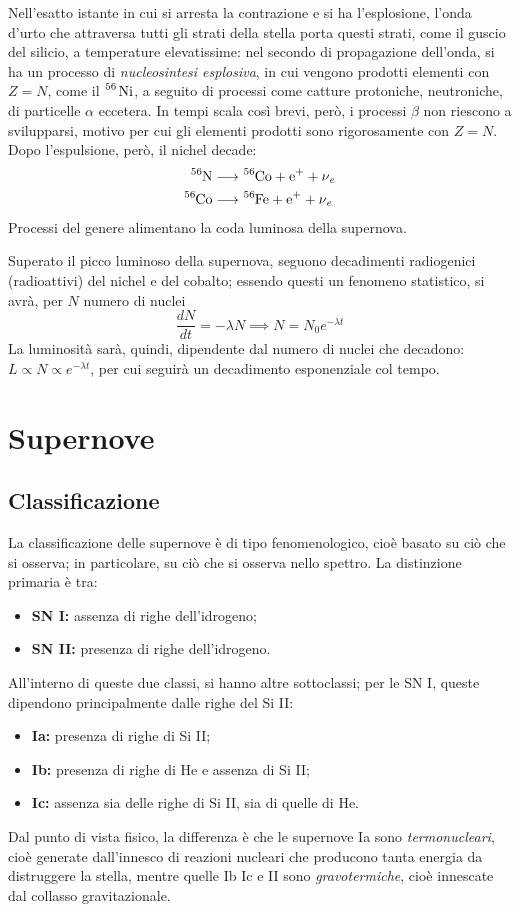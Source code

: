\documentclass[11pt, a4paper]{scrartcl}
\theoremstyle{style}
\theoremstyle{style1}
\numberwithin{equation}{subsection}
\begin{document}
Nell'esatto istante in cui si arresta la contrazione e si ha l'esplosione, l'onda d'urto che attraversa tutti gli strati della stella porta questi strati, come il guscio del silicio, a temperature elevatissime: nel secondo di propagazione dell'onda, si ha un processo di \textit{nucleosintesi esplosiva}, in cui vengono prodotti elementi con $Z=N$, come il $\ce{^{56} Ni}$, a seguito di processi come catture protoniche, neutroniche, di particelle $\alpha $ eccetera.
In tempi scala cos\`i brevi, per\`o, i processi $\beta $ non riescono a svilupparsi, motivo per cui gli elementi prodotti sono rigorosamente con $Z=N$.
Dopo l'espulsione, per\`o, il nichel decade:
\[
	\begin{split}
		\ce{^{56}N} &\longrightarrow \ce{^{56}Co + e+ + \nu _e}\\
		\ce{^{56}Co} &\longrightarrow \ce{^{56}Fe + e+ + \nu _e}
	\end{split}
\] 
Processi del genere alimentano la coda luminosa della supernova.

Superato il picco luminoso della supernova, seguono decadimenti radiogenici (radioattivi) del nichel e del cobalto; essendo questi un fenomeno statistico, si avr\`a, per $N$ numero di nuclei
\[
\frac{d N}{d t}  = - \lambda N \implies N = N_0 e^{-\lambda t}
\] 
La luminosit\`a sar\`a, quindi, dipendente dal numero di nuclei che decadono: $L\propto N \propto e^{-\lambda t}$, per cui seguir\`a un decadimento esponenziale col tempo.

\newpage

\section{Supernove}
\subsection{Classificazione}
La classificazione delle supernove \`e di tipo fenomenologico, cio\`e basato su ci\`o che si osserva; in particolare, su ci\`o che si osserva nello spettro.
La distinzione primaria \`e tra:
\begin{itemize}
	\item \textbf{SN I:} assenza di righe dell'idrogeno;
	\item \textbf{SN II:} presenza di righe dell'idrogeno.
\end{itemize}
All'interno di queste due classi, si hanno altre sottoclassi; per le SN I, queste dipendono principalmente dalle righe del Si II:
\begin{itemize}
	\item \textbf{Ia:} presenza di righe di Si II;
	\item \textbf{Ib:} presenza di righe di He e assenza di Si II;
	\item \textbf{Ic:} assenza sia delle righe di Si II, sia di quelle di He.
\end{itemize}
Dal punto di vista fisico, la differenza \`e che le supernove Ia sono \textit{termonucleari}, cio\`e generate dall'innesco di reazioni nucleari che producono tanta energia da distruggere la stella, mentre quelle Ib Ic e II sono \textit{gravotermiche}, cio\`e innescate dal collasso gravitazionale.
\end{document}
